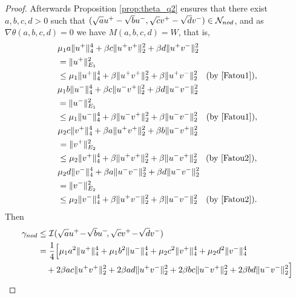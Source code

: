 \documentclass[10pt,a4paper]{amsart}
\numberwithin{equation}{section}
\begin{document}
\begin{proof}
Afterwards  Proposition \ref{prop:theta_q2}  ensures that there exist $a,b,c,d>0$
such that $(\sqrt{a} u^+ - \sqrt{b}u^-, \sqrt{c} v^+ - \sqrt{d}v^-)
\in \mathcal N_{\rm nod}$, and as $\nabla \theta (a,b,c,d)=0$ we have $M(a,b,c,d)=W$,
that is,
\begin{equation}\label{atante}
\begin{gathered}
\begin{aligned}
& \mu_1 a\|u^+\|_4^4 + \beta c \|u^+v^+\|_2^2 + \beta d \|u^+v^-\|_2^2 \\
&= \|u^+\|_{E_1}^2 \\
&\le \mu_1 \|u^+\|_4^4 + \beta \|u^+v^+\|_2^2  + \beta \|u^+v^-\|_2^2
  \quad \text{(by  \eqref{Fatou1})} ,
\end{aligned}\\
\begin{aligned}
&\mu_1 b\|u^-\|_4^4 + \beta c \|u^-v^+\|_2^2 + \beta d \|u^-v^-\|_2^2  \\
&= \|u^-\|_{E_1}^2 \\
&\leq  \mu_1 \|u^-\|_4^4 + \beta \|u^-v^+\|_2^2   + \beta \|u^-v^-\|_2^2 \quad
\text{(by \eqref{Fatou1})},
\end{aligned}\\
\begin{aligned}
&\mu_2 c\|v^+\|_4^4 + \beta a \|u^+v^+\|_2^2 + \beta b \|u^-v^+\|_2^2 \\
&= \|v^+\|_{E_2}^2  \\
&\leq \mu_2 \|v^+\|_4^4 + \beta \|u^+v^+\|_2^2  + \beta \|u^-v^+\|_2^2 \quad
\text{(by \eqref{Fatou2})},
\end{aligned} \\
\begin{aligned}
&\mu_2 d\|v^-\|_4^4 + \beta a \|u^-v^-\|_2^2 + \beta d \|u^-v^-\|_2^2 \\
& = \|v^-\|_{E_2}^2 \\
&\leq \mu_2 \|v^-\|_4^4 + \beta \|u^+v^-\|_2^2  + \beta \|u^-v^-\|_2^2 \quad
\text{(by \eqref{Fatou2})}.
\end{aligned}
\end{gathered}
\end{equation}
Then
 \begin{align*}
\gamma_{\rm nod}
&\leq  \mathcal I (\sqrt{a} u^+ \!-\!\sqrt{b}u^-\!, \sqrt{c} v^+ \!-\!\sqrt{d} v^-)\\
&=\frac{1}4\Big[\mu_1 a^2\|u^+\|_4^4 +\mu_1 b^2\|u^-\|_4^4
 + \mu_2 c^2\|v^+\|_4^4 + \mu_2 d^2\|v^-\|_4^4 \\
& \quad   +2\beta ac \|u^+ v^+\|_2^2 + 2\beta ad \|u^+ v^-\|_2^2
  + 2\beta bc\|u^- v^+\|_2^2 + 2\beta bd \|u^- v^-\|_2^2 \Big] \\

\end{align*}
\end{proof}
\end{document}
